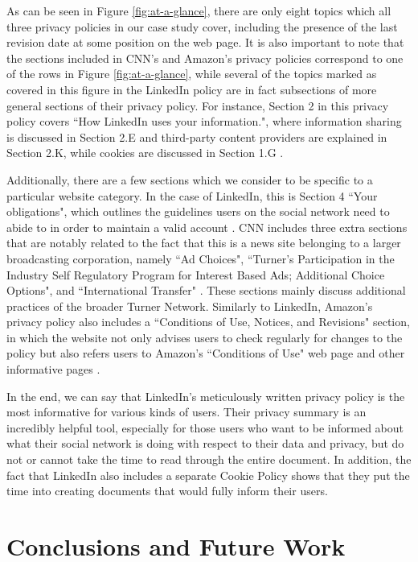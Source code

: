 \documentclass{acm_proc_article-sp}
\begin{document}
As can be seen in Figure \ref{fig:at-a-glance}, there are only eight topics which all three privacy policies in our case study cover, including the presence of the last revision date at some position on the web page. It is also important to note that the sections included in CNN's and Amazon's privacy policies correspond to one of the rows in Figure \ref{fig:at-a-glance}, while several of the topics marked as covered in this figure in the LinkedIn policy are in fact subsections of more general sections of their privacy policy. For instance, Section 2 in this privacy policy covers ``How LinkedIn uses your information.", where information sharing is discussed in Section 2.E and third-party content providers are explained in Section 2.K, while cookies are discussed in Section 1.G \cite{linkedin}.

Additionally, there are a few sections which we consider to be specific to a particular website category. In the case of LinkedIn, this is Section 4 ``Your obligations", which outlines the guidelines users on the social network need to abide to in order to maintain a valid account \cite{linkedin}. CNN includes three extra sections that are notably related to the fact that this is a news site belonging to a larger broadcasting corporation, namely ``Ad Choices", ``Turner's Participation in the Industry Self Regulatory Program for Interest Based Ads; Additional Choice Options", and ``International Transfer" \cite{cnn}. These sections mainly discuss additional practices of the broader Turner Network. Similarly to LinkedIn, Amazon's privacy policy also includes a ``Conditions of Use, Notices, and Revisions" section, in which the website not only advises users to check regularly for changes to the policy but also refers users to Amazon's ``Conditions of Use" web page and other informative pages \cite{amazon}.

In the end, we can say that LinkedIn's meticulously written privacy policy is the most informative for various kinds of users. Their privacy summary is an incredibly helpful tool, especially for those users who want to be informed about what their social network is doing with respect to their data and privacy, but do not or cannot take the time to read through the entire document. In addition, the fact that LinkedIn also includes a separate Cookie Policy shows that they put the time into creating documents that would fully inform their users.

\section{Conclusions and Future Work}

\nocite{*}


\end{document}
